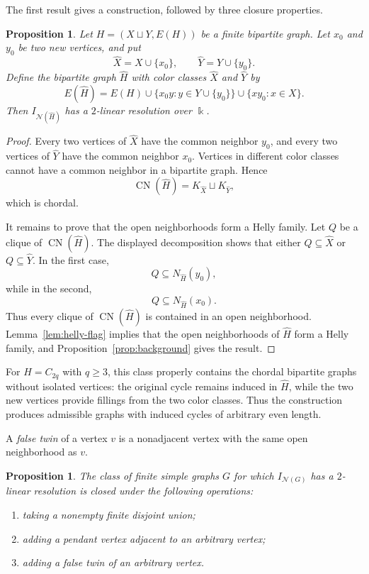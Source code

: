\documentclass[10pt,a4paper]{amsart}
\newtheorem{proposition}[theorem]{Proposition}
\numberwithin{equation}{section}
\newcommand{\NN}{\mathcal N}
\newcommand{\CN}{\operatorname{CN}}
\begin{document}
	The first result gives a construction, followed by three closure properties.
	
	\begin{proposition}\label{prop:two-sided-cone}
		Let \(H=(X\sqcup Y,E(H))\) be a finite bipartite graph. Let \(x_0\) and
		\(y_0\) be
		two new vertices, and put
		\[
		\widehat X=X\cup\{x_0\},
		\qquad
		\widehat Y=Y\cup\{y_0\}.
		\]
		Define the bipartite graph \(\widehat H\) with color classes
		\(\widehat X\) and \(\widehat Y\) by
		\[
		E(\widehat H)
		=
		E(H)
		\cup
		\{x_0y:y\in Y\cup\{y_0\}\}
		\cup
		\{xy_0:x\in X\}.
		\]
		Then \(I_{\NN(\widehat H)}\) has a \(2\)-linear resolution over
		\(\Bbbk\).
	\end{proposition}
	
	\begin{proof}
		Every two vertices of \(\widehat X\) have the common neighbor \(y_0\), and
		every two vertices of \(\widehat Y\) have the common neighbor \(x_0\).
		Vertices in different color classes cannot have a common neighbor in a
		bipartite graph. Hence
		\[
		\CN(\widehat H)=K_{\widehat X}\sqcup K_{\widehat Y},
		\]
		which is chordal.
		
		It remains to prove that the open neighborhoods form a Helly family. Let
		\(Q\) be a
		clique of \(\CN(\widehat H)\). The displayed decomposition shows that either
		\(Q\subseteq\widehat X\) or \(Q\subseteq\widehat Y\). In the first case,
		\[
		Q\subseteq N_{\widehat H}(y_0),
		\]
		while in the second,
		\[
		Q\subseteq N_{\widehat H}(x_0).
		\]
		Thus every clique of \(\CN(\widehat H)\) is contained in an open
		neighborhood. Lemma~\ref{lem:helly-flag} implies that the open neighborhoods of
		\(\widehat H\) form a Helly family, and Proposition~\ref{prop:background} gives the
		result.
	\end{proof}
	
	For \(H=C_{2q}\) with \(q\ge3\), this class properly
	contains the chordal bipartite graphs without isolated vertices: the original
	cycle remains induced in \(\widehat H\), while the two new vertices provide
	fillings from the two color classes. Thus the construction produces admissible
	graphs with induced cycles of arbitrary even length.
	
	A \emph{false twin} of a vertex \(v\) is a nonadjacent vertex with the same open neighborhood as \(v\).
	
	\begin{proposition}
		\label{prop:closure-operations}
		The class of finite simple graphs \(G\) for which
		\(I_{\NN(G)}\) has a \(2\)-linear resolution is closed under the
		following operations:
		\begin{enumerate}[label=\textup{(\alph*)}]
			\item taking a nonempty finite disjoint union;
			\item adding a pendant vertex adjacent to an arbitrary vertex;
			\item adding a false twin of an arbitrary vertex.
		\end{enumerate}
	\end{proposition}
	
\end{document}
